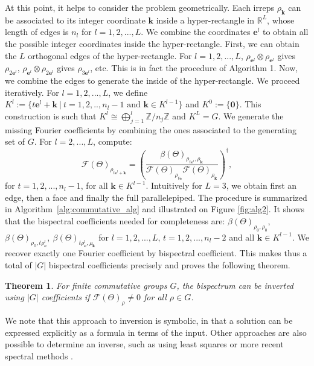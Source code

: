 \documentclass{article}
\theoremstyle{plain}
\newtheorem{theorem}{Theorem}[section]
\theoremstyle{definition}
\theoremstyle{remark}
\newcommand{\kbf}{\mathbf{k}}
\newcommand{\ebf}{\mathbf{e}}
\begin{document}
At this point, it helps to consider the problem geometrically. Each irreps $\rho_\kbf$ can be associated to its integer coordinate $\kbf$ inside a hyper-rectangle in $\mathbb{R}^L$, whose length of edges is $n_l$ for $l=1,2,...,L$. We combine the coordinates $\ebf^l$ to obtain all the possible integer coordinates inside the hyper-rectangle. First, we can obtain the $L$ orthogonal edges of the hyper-rectangle. For $l=1,2,...,L$, $\rho_{\ebf^l}\otimes \rho_{\ebf^l}$ gives $\rho_{2\ebf^l}$, $\rho_{\ebf^l}\otimes \rho_{2\ebf^l}$ gives $\rho_{3\ebf^l}$, etc. This is in fact the procedure of Algorithm 1. Now, we combine the edges to generate the inside of the hyper-rectangle. We proceed iteratively. For $l=1,2,...,L$, we define $K^l:=\{t\ebf^l + \kbf \ | \ t=1,2,..,n_l-1\text{ and } \kbf\in K^{l-1}\}$ and $K^0:=\{\mathbf{0}\}$. This construction is such that $K^l\cong\bigoplus_{j=1}^l \mathbb{Z}/n_j\mathbb{Z}$ and $K^L=G$. We generate the missing Fourier coefficients by combining the ones associated to the generating set of $G$.
For $l=2,...,L$, compute:
\begin{equation}
    \mathcal{F}(\Theta)_{\rho_{t\ebf^l+\kbf}}=\left(\frac{\beta(\Theta)_{\rho_{t\ebf^l},\rho_{\kbf}}}{\mathcal{F}(\Theta)_{\rho_{t\ebf}}\mathcal{F}(\Theta)_{\rho_{\kbf}}}\right)^\dagger,
\end{equation}
for $t=1,2,...,n_l-1$, for all $\kbf\in K^{l-1}$. Intuitively for $L=3$, we obtain first an edge, then a face and finally the full parallelepiped. The procedure is summarized in Algorithm~\ref{alg:commutative_alg} and illustrated on Figure \ref{fig:alg2}. It shows that the bispectral coefficients needed for completeness are: $\beta(\Theta)_{\rho_0,\rho_0}$, $\beta(\Theta)_{\rho_0,t\rho_{\ebf}^l},\ \beta(\Theta)_{t\rho_{\ebf}^l, \rho_\kbf} $ for $l=1,2,...,L$, $t=1,2,...,n_l-2$ and all $\kbf\in K^{l-1}$. We recover exactly one Fourier coefficient by bispectral coefficient. This makes thus a total of $|G|$ bispectral coefficients precisely and proves the following theorem.

\begin{theorem}
For finite commutative groups $G$, the bispectrum can be inverted using $|G|$ coefficients if $\mathcal{F}(\Theta)_\rho \neq 0$ for all $\rho \in G$.
\end{theorem}

We note that this approach to inversion is symbolic, in that a solution can be expressed explicitly as a formula in terms of the input.  Other approaches are also possible to determine an inverse, such as using least squares \cite{haniff1991least} or more recent spectral methods \cite{chen2018spectral}.
\end{document}
